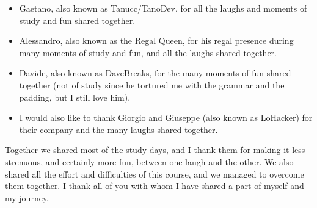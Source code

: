 \begin{spacing}{\myspacing}
\begin{itemize}[nosep] %
    \item Gaetano, also known as Tanucc/TanoDev, for all the laughs and moments of study and fun shared together. 
    \item Alessandro, also known as the Regal Queen, for his regal presence during many moments of study and fun, and all the laughs shared together.
    \item Davide, also known as DaveBreaks, for the many moments of fun shared together (not of study since he tortured me with the grammar and the padding, but I still love him).
    \item I would also like to thank Giorgio and Giuseppe (also known as LoHacker) for their company and the many laughs shared together.
\end{itemize}
\vspace{2ex}
\noindent Together we shared most of the study days, and I thank them for making it less strenuous, and certainly more fun, between one laugh and the other. We also shared all the effort and difficulties of this course, and we managed to overcome them together. 
\newline\newline \noindent I thank all of you with whom I have shared a part of myself and my journey.
\end{spacing}